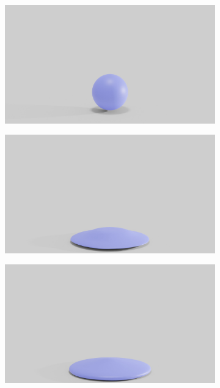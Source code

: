 \begin{figure}
\begin{subfigure}{.16\linewidth}
		{\includegraphics[width=2.0\textwidth]{images/soft_ball/vp/0200.jpg}}
		\label{sfig:ball-vc-1}
	\end{subfigure}%
	\begin{subfigure}{.16\linewidth}
		\centering
		{\includegraphics[width=2.0\textwidth]{images/soft_ball/vp/0250.jpg}}
		\label{sfig:ball-vc-2}
	\end{subfigure}%
	\begin{subfigure}{.16\linewidth}
		\centering
		{\includegraphics[width=2.0\textwidth]{images/soft_ball/vp/0300.jpg}}

\end{subfigure}
\end{figure}
